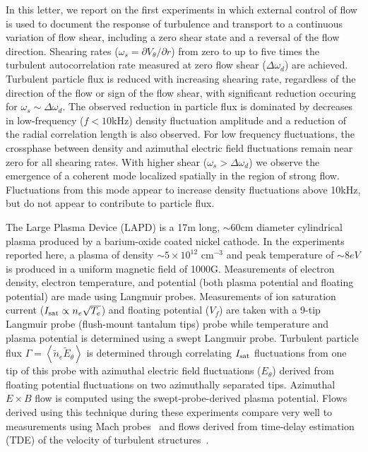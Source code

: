 \documentclass[aps,prl,amsmath,amssymb,preprint,superscriptaddress]{revtex4}
\begin{document}
In this letter, we report on the first experiments in which external
control of flow is used to document the response of turbulence and
transport to a continuous variation of flow shear, including a zero
shear state and a reversal of the flow direction.  
Shearing rates ($\omega_{s}= \partial V_{\theta}/\partial r$) from
zero to up to five times the turbulent autocorrelation rate measured
at zero flow shear ($\Delta \omega_{d}$) are achieved. Turbulent
particle flux is reduced with increasing shearing rate, regardless of the
direction of the flow or sign of the flow shear, with significant
reduction occuring for $\omega_s \sim \Delta \omega_d$.  The observed
reduction in particle flux is dominated by decreases in low-frequency
($f < 10$kHz) density fluctuation amplitude and a reduction of the
radial correlation length is also observed. For low frequency
fluctuations, the crossphase
between density and azimuthal electric field fluctuations remain near
zero for all shearing rates.  With higher shear ($\omega_s > \Delta
\omega_d$) we observe the emergence of a coherent mode localized spatially in the region
of strong flow. Fluctuations from this mode appear to increase density
fluctuations above 10kHz, but do not appear to contribute to particle
flux.   

The Large Plasma Device \cite{gek91} (LAPD) is a 17m long, $\sim 60$cm
diameter cylindrical plasma produced by a barium-oxide coated nickel
cathode. In the experiments reported here, a plasma of density $\sim 5
\times 10^{12}$ cm$^{-3}$ and peak temperature of $\sim 8 eV$ is
produced in a uniform magnetic field of 1000G.  Measurements of 
electron density, electron temperature, and potential (both plasma
potential and floating potential) are made using Langmuir probes.  
Measurements of ion saturation current ($I_{\rm sat} \propto n_e \sqrt{T_e}$) and floating
potential ($V_f$) are taken with a 9-tip Langmuir probe (flush-mount
tantalum tips) probe while temperature and plasma potential is
determined using a swept Langmuir probe. Turbulent particle flux
$\Gamma = \left<\tilde{n}_e \tilde{E}_\theta\right>$ is
determined through correlating $I_{\rm sat}$ fluctuations from one tip
of this probe with
azimuthal electric field fluctuations ($E_\theta$) derived from
floating potential fluctuations on two azimuthally separated tips.
Azimuthal $E\times B$ flow is computed
using the swept-probe-derived plasma potential.  Flows derived using
this technique during these experiments compare very well to measurements using
Mach probes~\cite{maggs2007} and flows derived from time-delay
estimation (TDE) of the velocity of turbulent structures~\cite{}.
  
\end{document}
